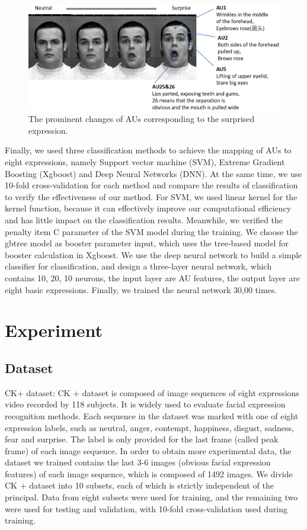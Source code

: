 \documentclass[10pt, conference, compsocconf]{IEEEtran}
\begin{document}
\begin{figure}[h]
	\centering
	\includegraphics[width=\linewidth]{AUexpression/surprise}
	\caption{The prominent changes of AUs corresponding to the surprised expression.}
\end{figure}

Finally, we used three classification methods to achieve the mapping of AUs to eight expressions, namely Support vector machine (SVM), Extreme Gradient Boosting (Xgboost) and Deep Neural Networks (DNN). At the same time, we use 10-fold cross-validation for each method and compare the results of classification to verify the effectiveness of our method. For SVM, we used linear kernel for the kernel function, because it can effectively improve our computational efficiency and has little impact on the classification results. Meanwhile, we verified the penalty item C parameter of the SVM model during the training. We choose the gbtree model as booster parameter input, which uses the tree-based model for booster calculation in Xgboost. We use the deep neural network to build a simple classifier for classification, and design a three-layer neural network, which contains 10, 20, 10 neurons, the input layer are AU features, the output layer are eight basic expressions. Finally, we trained the neural network 30,00 times.

\section{Experiment}

\subsection{Dataset}

CK+ dataset: CK + dataset\cite{Lucey2010The} is composed of image sequences of eight expressions video recorded by 118 subjects. It is widely used to evaluate facial expression recognition methods. Each sequence in the dataset was marked with one of eight expression labels, such as neutral, anger, contempt, happiness, disgust, sadness, fear and surprise. The label is only provided for the last frame (called peak frame) of each image sequence. In order to obtain more experimental data, the dataset we trained contains the last 3-6 images (obvious facial expression features) of each image sequence, which is composed of 1492 images. We divide CK + dataset into 10 subsets, each of which is strictly independent of the principal. Data from eight subsets were used for training, and the remaining two were used for testing and validation, with 10-fold cross-validation used during training.
\end{document}
